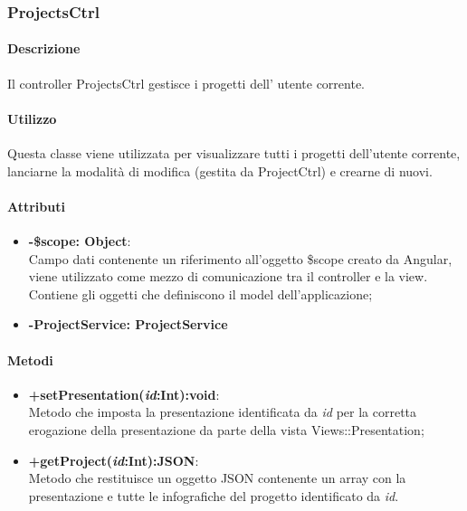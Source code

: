 \newpage
\subsubsection{ProjectsCtrl}
	\paragraph{Descrizione}
	Il controller ProjectsCtrl gestisce i progetti dell' utente corrente.
	
	\paragraph{Utilizzo}
	Questa classe viene utilizzata per visualizzare tutti i progetti dell'utente corrente, lanciarne la modalità di modifica (gestita da ProjectCtrl) e crearne di nuovi.\\
	\paragraph{Attributi}
	\begin{itemize}
		\item \textbf{-\$scope: Object}:\\
			Campo dati contenente un riferimento all'oggetto \$scope creato da Angular, viene utilizzato come mezzo di comunicazione tra il controller e la view. Contiene gli oggetti che definiscono il model dell'applicazione;
		\item \textbf{-ProjectService: ProjectService}
	\end{itemize}
	
	\paragraph{Metodi}
	\begin{itemize}
	  \item \textbf{+setPresentation(\textit{id}:Int):void}:\\
		  Metodo che imposta la presentazione identificata da  \textit{id} per la corretta erogazione della presentazione da parte della vista Views::Presentation;
	  \item \textbf{+getProject(\textit{id}:Int):JSON}:\\
		  Metodo che restituisce un oggetto JSON contenente un array con la presentazione e tutte le infografiche del progetto identificato da \textit{id}.
		  
	\end{itemize}
